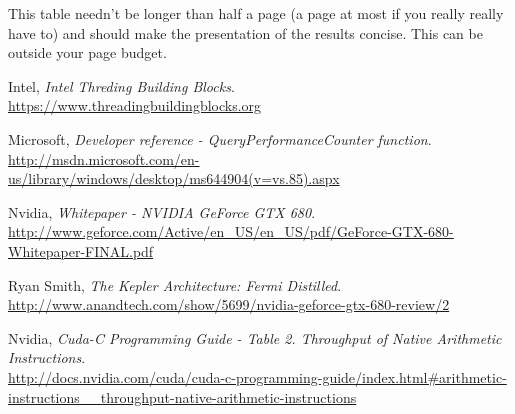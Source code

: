 \documentclass[11pt, oneside, a4paper]{article}
\begin{document}
This table needn't be longer than half a page (a page at most if you really really have to) and should make the presentation of the results concise.  This can be outside your page budget.


\clearpage




\begin{thebibliography}{9}

  Intel,
  \emph{Intel Threding Building Blocks}. \\
  \url{https://www.threadingbuildingblocks.org}

  Microsoft,
  \emph{Developer reference - QueryPerformanceCounter function}. \\
  \url{http://msdn.microsoft.com/en-us/library/windows/desktop/ms644904(v=vs.85).aspx}

	Nvidia,
	\emph{Whitepaper - NVIDIA GeForce GTX 680}. \\
	\url{http://www.geforce.com/Active/en_US/en_US/pdf/GeForce-GTX-680-Whitepaper-FINAL.pdf}

	Ryan Smith,
	\emph{The Kepler Architecture: Fermi Distilled}. \\
	\url{http://www.anandtech.com/show/5699/nvidia-geforce-gtx-680-review/2}

	Nvidia,
	\emph{Cuda-C Programming Guide - Table 2. Throughput of Native Arithmetic Instructions}. \\
	\url{http://docs.nvidia.com/cuda/cuda-c-programming-guide/index.html#arithmetic-instructions__throughput-native-arithmetic-instructions}

\end{thebibliography}
\end{document}
